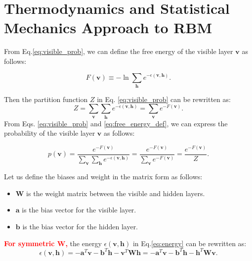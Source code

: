 \documentclass[10pt, a4paper]{article}
\begin{document}
\section{Thermodynamics and Statistical Mechanics Approach to RBM}
From Eq.\eqref{eq:visible_prob}, we can define the free energy of the visible layer $\mathbf{v}$ as follows:
\begin{checkpointbox}
  \begin{equation}
    \label{eq:free_energy_def}
    F(\mathbf{v}) \equiv -\ln \sum_{\mathbf{h}} e^{-\epsilon(\mathbf{v}, \mathbf{h})}.
  \end{equation}
\end{checkpointbox}
Then the partition function $Z$ in Eq. \eqref{eq:visible_prob} can be rewritten as:
\begin{equation}
  \label{eq:partition_function_free_energy}
  Z=\sum_{\mathbf{v}}\sum_{\mathbf{h}}e^{-\epsilon(\mathbf{v}, \mathbf{h})}
  = \sum_{\mathbf{v}} e^{-F(\mathbf{v})}.
\end{equation}
From Eqs. \eqref{eq:visible_prob} and \eqref{eq:free_energy_def},
we can express the probability of the visible layer $\mathbf{v}$ as follows:
\begin{checkpointbox}
  \begin{equation}
    \label{eq:visible_prob_free_energy}
    p(\mathbf{v}) = \dfrac{e^{-F(\mathbf{v})}}{\sum_{\mathbf{v}}\sum_{\mathbf{h}}
                                      e^{-\epsilon(\mathbf{v}, \mathbf{h})}}
              = \dfrac{e^{-F(\mathbf{v})}}{\sum_{\mathbf{v}} e^{-F(\mathbf{v})}}
              = \dfrac{e^{-F(\mathbf{v})}}{Z}.
  \end{equation}
\end{checkpointbox}

Let us define the biases and weight in the matrix form as follows:
\begin{itemize}
  \item $\mathbf{W}$ is the weight matrix between the visible and hidden layers.
  \item $\mathbf{a}$ is the bias vector for the visible layer.
  \item $\mathbf{b}$ is the bias vector for the hidden layer.
\end{itemize}
{\textcolor{red}{\bf{For symmetric $\mathbf{W}$,}}} the energy $\epsilon(\mathbf{v}, \mathbf{h})$ 
in Eq.\eqref{eq:energy} can be rewritten as:
\begin{equation}
  \label{eq:energy_matrix_form}
  \epsilon(\mathbf{v}, \mathbf{h}) = -\mathbf{a}^T \mathbf{v} - \mathbf{b}^T \mathbf{h}
    -\mathbf{v}^T \mathbf{W} \mathbf{h}
    =-\mathbf{a}^T \mathbf{v} - \mathbf{b}^T \mathbf{h}
    -\mathbf{h}^T \mathbf{W} \mathbf{v}.
\end{equation}
\end{document}
